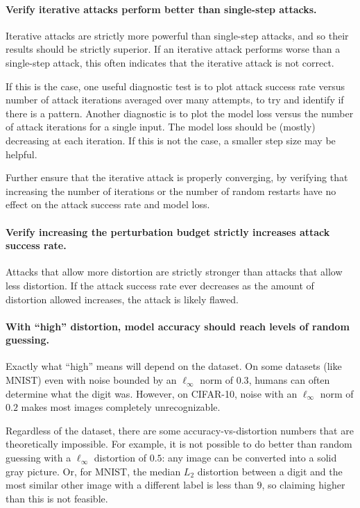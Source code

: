 \documentclass{article} %
\begin{document}
\paragraph{Verify iterative attacks perform better than single-step attacks.}
Iterative attacks are strictly more powerful than single-step
attacks, and so their results should be strictly superior.
%
If an
iterative attack performs worse than a single-step attack, this often
indicates that the iterative attack is not correct.

If this is the case, one useful diagnostic test is to plot attack
success rate versus number of attack iterations averaged over many
attempts, to try and identify if there is a pattern.
%
Another diagnostic is to plot the model loss versus the number of attack
iterations for a single input.
%
The model loss should be (mostly) decreasing at each iteration.
%
If this is not the case, a smaller step size may be helpful.

Further ensure that the iterative attack is properly converging, by verifying that increasing the number of iterations or the number of random restarts have no effect on the attack success rate and model loss.

\paragraph{Verify increasing the perturbation budget strictly
increases attack success rate.}
\label{sec:monodistortion}
Attacks that allow more distortion are strictly stronger
than attacks that allow less distortion.
%
If the attack success rate
ever decreases as the amount of distortion allowed increases, the
attack is likely flawed.

\paragraph{With ``high'' distortion, model accuracy should reach
  levels of random guessing.}
%
Exactly what ``high'' means will depend on the dataset.
%
On some datasets (like MNIST) even with noise bounded by an
$\ell_\infty$ norm of $0.3$, humans can often determine what
the digit was.
%
However, on CIFAR-10, noise with an $\ell_\infty$ norm of $0.2$ makes most
images completely unrecognizable.

Regardless of the dataset, there are some accuracy-vs-distortion
numbers that are theoretically impossible.
%
For example, it is not
possible to do better than random guessing with a $\ell_\infty$
distortion of $0.5$: any image can be converted into a solid gray
picture.
%
Or, for MNIST, the median $L_2$ distortion between a
digit and the most similar other image with a different label
is less than $9$, so claiming higher than this is not feasible.
\end{document}
